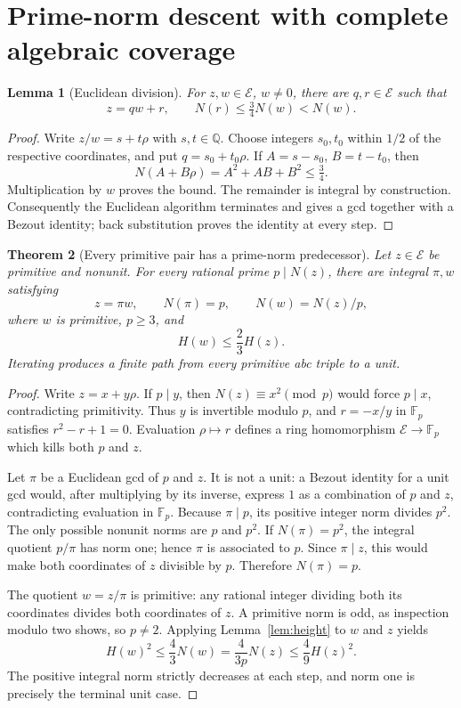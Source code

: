 \documentclass[11pt]{article}
\newtheorem{theorem}{Theorem}[section]
\newtheorem{lemma}[theorem]{Lemma}
\theoremstyle{definition}
\theoremstyle{remark}
\newcommand{\QQ}{\mathbb Q}
\begin{document}
\section{Prime-norm descent with complete algebraic coverage}
\begin{lemma}[Euclidean division]\label{lem:euclidean}
For $z,w\in\mathcal E$, $w\ne0$, there are $q,r\in\mathcal E$ such that
\[
z=qw+r,\qquad N(r)\le\tfrac34N(w)<N(w).
\]
\end{lemma}
\begin{proof}
Write $z/w=s+t\rho$ with $s,t\in\QQ$. Choose integers $s_0,t_0$ within $1/2$ of the respective coordinates, and put $q=s_0+t_0\rho$. If $A=s-s_0$, $B=t-t_0$, then
\[
N(A+B\rho)=A^2+AB+B^2\le\tfrac34.
\]
Multiplication by $w$ proves the bound. The remainder is integral by construction. Consequently the Euclidean algorithm terminates and gives a gcd together with a Bezout identity; back substitution proves the identity at every step.
\end{proof}

\begin{theorem}[Every primitive pair has a prime-norm predecessor]\label{thm:coverage}
Let $z\in\mathcal E$ be primitive and nonunit. For every rational prime $p\mid N(z)$, there are integral $\pi,w$ satisfying
\begin{equation}\label{eq:descent}
z=\pi w,\qquad N(\pi)=p,\qquad N(w)=N(z)/p,
\end{equation}
where $w$ is primitive, $p\ge3$, and
\begin{equation}\label{eq:contraction}
H(w)\le\frac23 H(z).
\end{equation}
Iterating produces a finite path from every primitive abc triple to a unit.
\end{theorem}
\begin{proof}
Write $z=x+y\rho$. If $p\mid y$, then $N(z)\equiv x^2\pmod p$ would force $p\mid x$, contradicting primitivity. Thus $y$ is invertible modulo $p$, and $r=-x/y$ in $\mathbb F_p$ satisfies $r^2-r+1=0$. Evaluation $\rho\mapsto r$ defines a ring homomorphism $\mathcal E\to\mathbb F_p$ which kills both $p$ and $z$.

Let $\pi$ be a Euclidean gcd of $p$ and $z$. It is not a unit: a Bezout identity for a unit gcd would, after multiplying by its inverse, express $1$ as a combination of $p$ and $z$, contradicting evaluation in $\mathbb F_p$. Because $\pi\mid p$, its positive integer norm divides $p^2$. The only possible nonunit norms are $p$ and $p^2$. If $N(\pi)=p^2$, the integral quotient $p/\pi$ has norm one; hence $\pi$ is associated to $p$. Since $\pi\mid z$, this would make both coordinates of $z$ divisible by $p$. Therefore $N(\pi)=p$.

The quotient $w=z/\pi$ is primitive: any rational integer dividing both its coordinates divides both coordinates of $z$. A primitive norm is odd, as inspection modulo two shows, so $p\ne2$. Applying Lemma~\ref{lem:height} to $w$ and $z$ yields
\[
H(w)^2\le\frac43N(w)=\frac{4}{3p}N(z)\le\frac49H(z)^2.
\]
The positive integral norm strictly decreases at each step, and norm one is precisely the terminal unit case.
\end{proof}
\end{document}
